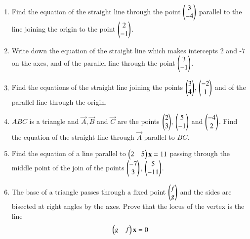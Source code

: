 \begin{enumerate}[label=\arabic*.,ref=\thesubsection.\theenumi]
\item Find the equation of the straight line through the point $\begin{pmatrix}3\\-4\end{pmatrix}$ parallel to the line joining the origin to the point
$\begin{pmatrix}2\\-1\end{pmatrix}$.
\item Write down the equation of the straight line which makes intercepts 2 and -7 on the axes, and of the parallel line through
the point $\begin{pmatrix}3\\-1\end{pmatrix}$.
\item Find the equations of the straight line joining the points $\begin{pmatrix}3\\4\end{pmatrix}$, $\begin{pmatrix}-2\\1\end{pmatrix}$ and of the parallel line through
the origin.
\item $ABC$ is a triangle and $\vec{A}, \vec{B}$ and $\vec{C}$ are the points $\begin{pmatrix}2\\3\end{pmatrix}$, $\begin{pmatrix}5\\-1\end{pmatrix}$ and $\begin{pmatrix}-4\\2\end{pmatrix}$.  Find the equation
of the straight line through $\vec{A}$ parallel to $BC$.
\item Find the equation of a line parallel to $\begin{pmatrix}2 & 5\end{pmatrix}\mathbf{x}=11$ passing through the middle point of the join of the points $\begin{pmatrix}-7\\3\end{pmatrix}$, $\begin{pmatrix}5\\-11\end{pmatrix}$.
\\
\solution

\item The base of a triangle passes through a fixed point $\begin{pmatrix}f\\g\end{pmatrix}$ and the sides are bisected at right angles by the axes.  Prove that the locus
of the vertex is the line
\begin{equation}
\begin{pmatrix}g & f\end{pmatrix}\mathbf{x} = 0
\end{equation}
\end{enumerate}
